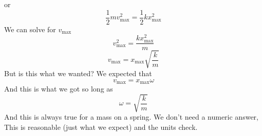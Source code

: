 \documentclass{book}
\begin{document}
or%
\begin{equation*}
\frac{1}{2}mv_{\max }^{2}=\frac{1}{2}kx_{\max }^{2}
\end{equation*}%
We can solve for $v_{\max }$ 
\begin{equation*}
v_{\max }^{2}=\frac{kx_{\max }^{2}}{m}
\end{equation*}%
\begin{equation*}
v_{\max }=x_{\max }\sqrt{\frac{k}{m}}
\end{equation*}%
But is this what we wanted? We expected that 
\begin{equation*}
v_{\max }=x_{\max }\omega
\end{equation*}%
And this is what we got so long as 
\begin{equation*}
\omega =\sqrt{\frac{k}{m}}
\end{equation*}%
And this is always true for a mass on a spring. We don't need a numeric
answer, This is reasonable (just what we expect) and the units check.
\end{document}

